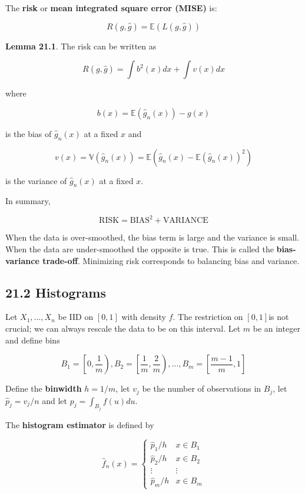 The \textbf{risk} or \textbf{mean integrated square error (MISE)} is:

\[ R(g, \hat{g}) = \mathbb{E}\left(L(g, \hat{g}) \right) \]

\textbf{Lemma 21.1}. The risk can be written as

\[ R(g, \hat{g}) = \int b^{2}(x) dx + \int v(x) dx \]

where

\[ b(x) = \mathbb{E}(\hat{g}_{n}(x)) - g(x) \]

is the bias of \(\hat{g}_{n}(x)\) at a fixed \(x\) and

\[ v(x) = \mathbb{V}(\hat{g}_{n}(x)) = \mathbb{E}\left( \hat{g}_{n}(x) - \mathbb{E}(\hat{g}_{n}(x))^{2}\right) \]

is the variance of \(\hat{g}_{n}(x)\) at a fixed \(x\).

In summary,

\[ \text{RISK} = \text{BIAS}^{2} + \text{VARIANCE} \]

When the data is over-smoothed, the bias term is large and the variance
is small. When the data are under-smoothed the opposite is true. This is
called the \textbf{bias-variance trade-off}. Minimizing risk corresponds
to balancing bias and variance.

\subsection*{21.2 Histograms}\label{histograms}

Let \(X_{1}, \dots, X_{n}\) be IID on \([0, 1]\) with density \(f\). The
restriction on \([0, 1]\)is not crucial; we can always rescale the data
to be on this interval. Let \(m\) be an integer and define bins

\[ B_{1} = \left[0, \frac{1}{m} \right), B_{2} = \left[\frac{1}{m}, \frac{2}{m} \right), \dots, B_m = \left[\frac{m - 1}{m}, 1 \right] \]

Define the \textbf{binwidth} \(h = 1 / m\), let \(v_{j}\) be the number of
observations in \(B_{j}\), let \(\hat{p}_{j} = v_{j} / n\) and let
\(p_{j} = \int_{B_{j}} f(u) du\).

The \textbf{histogram estimator} is defined by

\[
\hat{f}_{n}(x) = \begin{cases}
\hat{p}_{1} / h & x \in B_{1} \\
\hat{p}_{2} / h & x \in B_{2} \\
\vdots & \vdots\\
\hat{p}_m / h & x \in B_m
\end{cases}
\]

